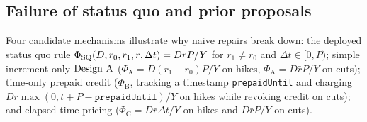 \subsection{Failure of status quo and prior proposals}\label{subsec:failures}

Four candidate mechanisms illustrate why naive repairs break down: the deployed status quo rule $\Phi_{\mathrm{SQ}}(D, r_0, r_1, \bar{r}, \Delta t) = D \bar{r} P/Y$ for $r_1 \neq r_0$ and $\Delta t \in [0, P)$; simple increment-only $\textup{Design A}$ ($\Phi_{\mathrm{A}} = D(r_1 - r_0)P/Y$ on hikes, $\Phi_{\mathrm{A}} = D\bar{r}P/Y$ on cuts); time-only prepaid credit ($\Phi_{\mathrm{B}}$, tracking a timestamp \texttt{prepaidUntil} and charging $D\bar{r}\max(0, t + P - \texttt{prepaidUntil})/Y$ on hikes while revoking credit on cuts); and elapsed-time pricing ($\Phi_{\mathrm{C}} = D\bar{r}\Delta t/Y$ on hikes and $D\bar{r}P/Y$ on cuts).

